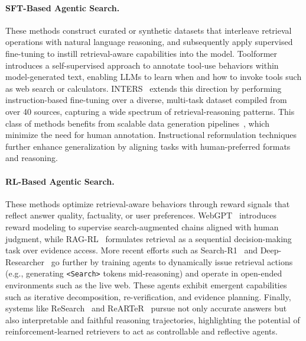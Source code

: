 \paragraph{SFT-Based Agentic Search.} These methods construct curated or synthetic datasets that interleave retrieval operations with natural language reasoning, and subsequently apply supervised fine-tuning to instill retrieval-aware capabilities into the model. Toolformer~\cite{schick2023toolformer} introduces a self-supervised approach to annotate tool-use behaviors within model-generated text, enabling LLMs to learn when and how to invoke tools such as web search or calculators. INTERS~\cite{zhu2024inters} extends this direction by performing instruction-based fine-tuning over a diverse, multi-task dataset compiled from over 40 sources, capturing a wide spectrum of retrieval-reasoning patterns. This class of methods benefits from scalable data generation pipelines~\cite{mao2024rag, zhang2024raft, li2025search}, which minimize the need for human annotation. Instructional reformulation techniques~\cite{lin2023ra,zhu2024inters, nguyen2024sfr} further enhance generalization by aligning tasks with human-preferred formats and reasoning.

\paragraph{RL-Based Agentic Search.} These methods optimize retrieval-aware behaviors through reward signals that reflect answer quality, factuality, or user preferences. WebGPT~\cite{nakano2021webgpt} introduces reward modeling to supervise search-augmented chains aligned with human judgment, while RAG-RL~\cite{huang2025rag} formulates retrieval as a sequential decision-making task over evidence access. More recent efforts such as Search-R1~\cite{jin2025search} and Deep-Researcher~\cite{zheng2025deepresearcher} go further by training agents to dynamically issue retrieval actions (e.g., generating \texttt{<Search>} tokens mid-reasoning) and operate in open-ended environments such as the live web. These agents exhibit emergent capabilities such as iterative decomposition, re-verification, and evidence planning. Finally, systems like ReSearch~\cite{chen2025learning} and ReARTeR~\cite{sun2025rearter} pursue not only accurate answers but also interpretable and faithful reasoning trajectories, highlighting the potential of reinforcement-learned retrievers to act as controllable and reflective agents.

